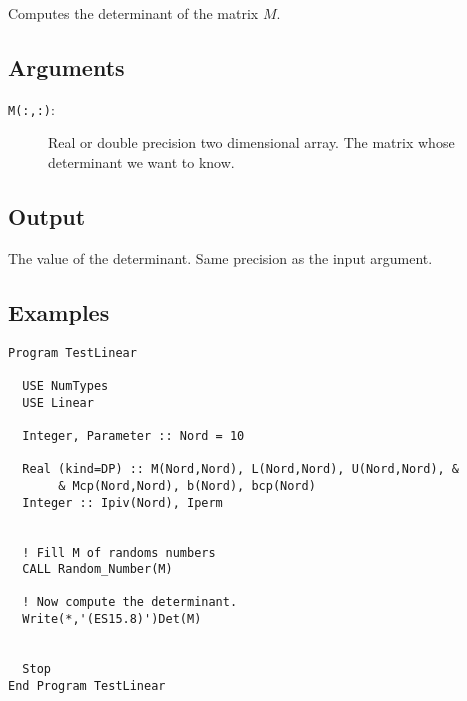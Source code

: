 Computes the determinant of the matrix $M$.

\subsection{Arguments}

\begin{description}
\item[\texttt{M(:,:)}: ] Real or double precision two dimensional
  array. The matrix whose determinant we want to know.
\end{description}

\subsection{Output}

The value of the determinant. Same precision as the input argument.

\subsection{Examples}

\begin{verbatim}
Program TestLinear

  USE NumTypes
  USE Linear

  Integer, Parameter :: Nord = 10

  Real (kind=DP) :: M(Nord,Nord), L(Nord,Nord), U(Nord,Nord), &
       & Mcp(Nord,Nord), b(Nord), bcp(Nord)
  Integer :: Ipiv(Nord), Iperm


  ! Fill M of randoms numbers
  CALL Random_Number(M)

  ! Now compute the determinant.
  Write(*,'(ES15.8)')Det(M)


  Stop
End Program TestLinear
\end{verbatim}

